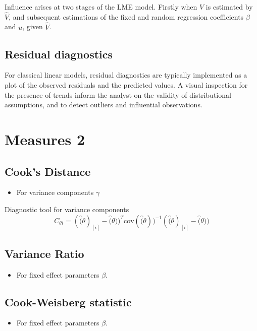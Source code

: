 \documentclass[12pt, a4paper]{report}
\begin{document}
Influence arises at two stages of the LME model. Firstly when $V$ is estimated by $\hat{V}$, and subsequent
estimations of the fixed and random regression coefficients $\beta$ and $u$, given $\hat{V}$.


\subsection{Residual diagnostics} %
For classical linear models, residual diagnostics are typically implemented as a plot of the observed residuals and the predicted values. A visual inspection for the presence of trends inform the analyst on the validity of distributional assumptions, and to detect outliers and influential observations.
	




\section{Measures 2} %

\subsection{Cook's Distance} %
\begin{itemize}
	\item For variance components $\gamma$
\end{itemize}


Diagnostic tool for variance components
\[ C_{\theta i} =(\hat(\theta)_{[i]} - \hat(\theta))^{T}\mbox{cov}( \hat(\theta))^{-1}(\hat(\theta)_{[i]} - \hat(\theta))\]



\subsection{Variance Ratio} %
\begin{itemize}
	\item For fixed effect parameters $\beta$.
\end{itemize}



\subsection{Cook-Weisberg statistic} %
\begin{itemize}
	\item For fixed effect parameters $\beta$.
\end{itemize}
\end{document}

